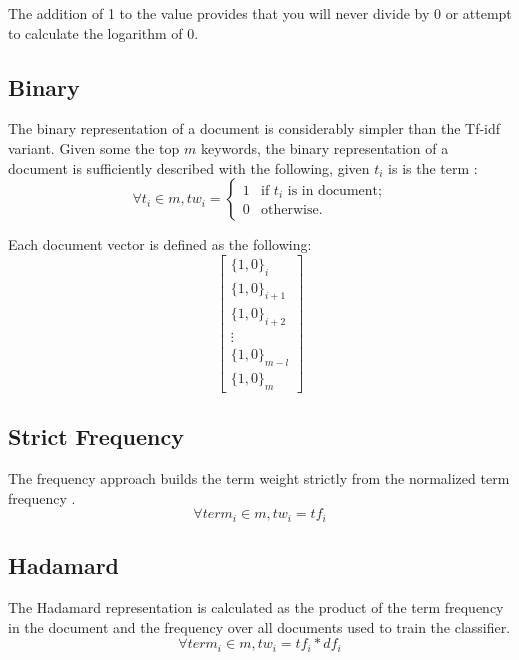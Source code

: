 \documentclass[11pt,twocolumn]{article}
\begin{document}
The addition of 1 to the value provides that you will never divide by 0 or attempt to calculate the logarithm of 0.

\subsection{Binary}
The binary representation of a document is considerably simpler than the Tf-idf variant.  Given some the top $m$ keywords, the binary representation of a document is sufficiently described with the following, given $t_i$ is is the term \cite{Mane2001}:
\begin{equation*}
\forall t_i \in m, 
tw_i = 
\begin{cases}
1 & \text{if $t_i$ is in document;}\\
0 & \text{otherwise.}
\end{cases}
\end{equation*}

Each document vector is defined as the following:
\begin{equation*}
\begin{bmatrix}\{1,0\}_i \\ \{1,0\}_{i+1} \\ \{1,0\}_{i+2} \\ \vdots \\ \{1,0\}_{m-l} \\ \{1,0\}_m
\end{bmatrix}
\end{equation*}

\subsection{Strict Frequency}
The frequency approach builds the term weight strictly from the normalized term frequency \cite{Mane2001}.
\begin{equation*}
\forall term_i \in m,
tw_i = tf_i
\end{equation*}

\subsection{Hadamard}
The Hadamard representation is calculated as the product of the term frequency in the document and the frequency over all documents used to train the classifier.
\begin{equation*}
\forall term_i \in m,
tw_i = tf_i \ast df_i
\end{equation*}
\end{document}
